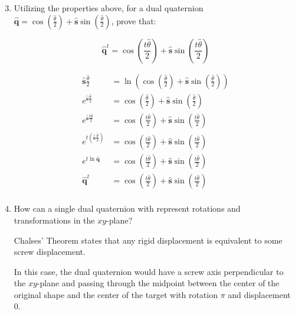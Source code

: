 \documentclass[10pt,\jkfside,a4paper]{article}
\begin{document}
\begin{enumerate}
\begin{enumerate}

\setcounter{enumi}{2}

\item Utilizing the properties above, for a dual quaternion 
$\hat{\mathbf{q}} = \cos\left( \frac{\hat{\theta}}{2} \right) + 
\hat{\mathbf{s}} \sin \left( \frac{\hat{\theta}}{2} \right) $, prove that:

\[
\hat{\mathbf{q}}^t = \cos\left( \frac{t\hat{\theta}}{2} \right) + 
\hat{\mathbf{s}}\sin\left( \frac{t\hat{\theta}}{2} \right)
\]

\[
\begin{split}
\hat{\mathbf{s}}\frac{\hat{\theta}}{2} &=
\ln \left( \cos\left( \frac{\hat{\theta}}{2} \right) +
\hat{\mathbf{s}}\sin\left( \frac{\hat{\theta}}{2} \right) \right) \\
e^{\hat{\mathbf{s}}\frac{\hat{\theta}}{2}} &=
\cos\left( \frac{\hat{\theta}}{2} \right) +
\hat{\mathbf{s}}\sin\left( \frac{\hat{\theta}}{2} \right) \\
e^{\hat{\mathbf{s}}\frac{t\hat{\theta}}{2}} &=
\cos\left( \frac{t\hat{\theta}}{2} \right) +
\hat{\mathbf{s}}\sin\left( \frac{t\hat{\theta}}{2} \right) \\
e^{t\left(\hat{\mathbf{s}}\frac{\hat{\theta}}{2}\right)} &=
\cos\left( \frac{t\hat{\theta}}{2} \right) +
\hat{\mathbf{s}}\sin\left( \frac{t\hat{\theta}}{2} \right) \\
e^{t\ln \hat{\mathbf{q}}} &=
\cos\left( \frac{t\hat{\theta}}{2} \right) +
\hat{\mathbf{s}}\sin\left( \frac{t\hat{\theta}}{2} \right) \\
\hat{\mathbf{q}}^t &=
\cos\left( \frac{t\hat{\theta}}{2} \right) +
\hat{\mathbf{s}}\sin\left( \frac{t\hat{\theta}}{2} \right) \\
\end{split}
\]

\item How can a single dual quaternion with represent rotations and
transformations in the $xy$-plane?

Chalses' Theorem states that any rigid displacement is equivalent to some
screw displacement.

In this case, the dual quaternion would have a screw axis perpendicular to
the $xy$-plane and passing through the midpoint between the center of the
original shape and the center of the target with rotation $\pi$ and
displacement 0.


\end{enumerate}
\end{enumerate}
\end{document}

